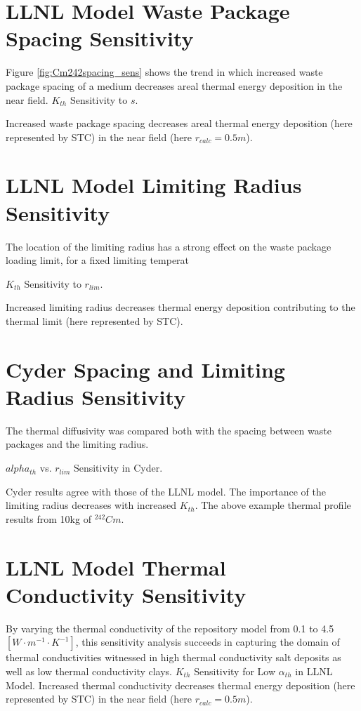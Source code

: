 \documentclass[letterpaper]{article}
\begin{document}
{\section{LLNL Model Waste Package Spacing Sensitivity}
  Figure \ref{fig:Cm242spacing_sens} shows the trend in which increased waste 
  package spacing of a medium decreases areal thermal energy 
  deposition in the near field.
  $K_{th}$ Sensitivity to $s$.
  
  Increased waste package 
  spacing decreases areal thermal energy deposition 
  (here represented by STC) in the near field (here $r_{calc} = 0.5m$).


\section{LLNL Model Limiting Radius Sensitivity}
  The location of the limiting radius has a strong effect on the 
  waste package loading limit, for a fixed limiting temperat
  
  $K_{th}$ Sensitivity to $r_{lim}$.
  
  Increased limiting radius decreases thermal energy deposition contributing to 
  the thermal limit (here represented by STC).

\section{Cyder Spacing and Limiting Radius Sensitivity}
  The thermal diffusivity was compared both with the 
  spacing between waste packages and the limiting radius. 

  $alpha_{th}$ vs. $r_{lim}$ Sensitivity in Cyder.

  Cyder results agree with those of the LLNL model. The importance of the 
  limiting radius decreases with increased $K_{th}$. The above example thermal 
  profile results from 10kg of $^{242}Cm$.

\section{LLNL Model Thermal Conductivity Sensitivity}
By varying the thermal conductivity of the repository model from 0.1 to 4.5 
$[W\cdot m^{-1} \cdot K^{-1}]$, this sensitivity analysis succeeds in capturing 
the domain of thermal conductivities witnessed in high thermal conductivity 
salt deposits as well as low thermal conductivity clays.
$K_{th}$ Sensitivity for Low $\alpha_{th}$ in LLNL Model.
Increased thermal conductivity decreases thermal energy deposition 
(here represented by STC) in the near field (here $r_{calc} = 0.5m$).

}
\end{document}
